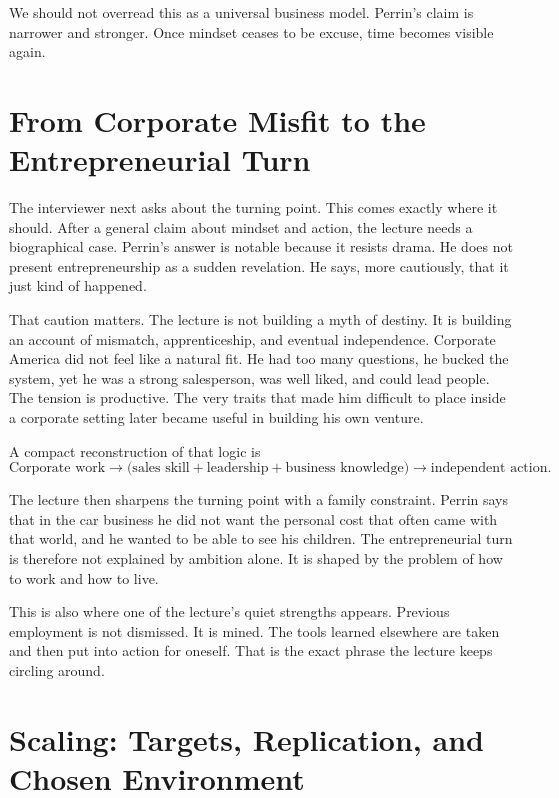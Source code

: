 We should not overread this as a universal business model. Perrin's claim is narrower and stronger. Once mindset ceases to be excuse, time becomes visible again.

\section{From Corporate Misfit to the Entrepreneurial Turn}

The interviewer next asks about the turning point. This comes exactly where it should. After a general claim about mindset and action, the lecture needs a biographical case. Perrin's answer is notable because it resists drama. He does not present entrepreneurship as a sudden revelation. He says, more cautiously, that it just kind of happened.

That caution matters. The lecture is not building a myth of destiny. It is building an account of mismatch, apprenticeship, and eventual independence. Corporate America did not feel like a natural fit. He had too many questions, he bucked the system, yet he was a strong salesperson, was well liked, and could lead people. The tension is productive. The very traits that made him difficult to place inside a corporate setting later became useful in building his own venture.

A compact reconstruction of that logic is
\begin{equation}
\text{Corporate work} \to
\bigl(\text{sales skill} + \text{leadership} + \text{business knowledge}\bigr)
\to \text{independent action}.
\end{equation}

The lecture then sharpens the turning point with a family constraint. Perrin says that in the car business he did not want the personal cost that often came with that world, and he wanted to be able to see his children. The entrepreneurial turn is therefore not explained by ambition alone. It is shaped by the problem of how to work and how to live.

This is also where one of the lecture's quiet strengths appears. Previous employment is not dismissed. It is mined. The tools learned elsewhere are taken and then put into action for oneself. That is the exact phrase the lecture keeps circling around.

\section{Scaling: Targets, Replication, and Chosen Environment}

